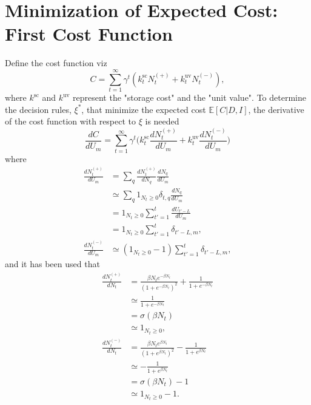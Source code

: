 \section{Minimization of Expected Cost: First Cost Function}
\label{app:deriva}
Define the cost function viz
\begin{equation}
	C = \sum_{t=1}^{\infty}\gamma^{t}(k^\text{sc}_{t}N_{t}^{(+)}+k_{t}^\text{uv}N_{t}^{(-)}),
\end{equation}
where $k^\text{sc}$ and $k^\text{uv}$ represent the "storage cost" and the "unit value". To determine the decision rules, $\xi^*$, that minimize the expected cost $\mathbb{E}[C|D,I]$, the derivative of the cost function with respect to $\xi$ is needed
\begin{equation}
		\frac{dC}{dU_m} = \sum_{t=1}^{\infty}\gamma^{t}\bigg(k^\text{sc}_{t}\frac{dN_{t}^{(+)}}{dU_m}+k_{t}^\text{uv}\frac{dN_{t}^{(-)}}{dU_m}\bigg)
	\label{eq:deriv_1ab}
\end{equation}
where
\begin{equation}
	\begin{split}
		\frac{dN_{t}^{(+)}}{dU_m}& =\sum_q 	\frac{dN_{t}^{(+)}}{dN_q}\frac{dN_q}{dU_m}\\
		& \simeq\sum_q 	1_{N_{t}\geq 0}\delta_{t,q}\frac{dN_q}{dU_m}\\
		& = 1_{N_{t}\geq 0}\sum_{t'=1}^t\frac{dU_{t'-L}}{dU_m}\\
		& = 1_{N_{t}\geq 0}\sum_{t'=1}^t\delta_{t'-L,m},\\
		\frac{dN_{t}^{(-)}}{dU_m} &\simeq (1_{N_t\geq 0}-1)\sum_{t'=1}^t\delta_{t'-L,m},
		\label{eq:deriv_2ab}
	\end{split}
\end{equation}
and it has been used that
\begin{equation}
	\begin{split}
		\frac{dN_t^{(+)}}{dN_t} & =\frac{\beta N_te^{-\beta N_t}}{(1+e^{-\beta N_t})^2}+\frac{1}{1+e^{-\beta N_t}}\\
		& \simeq \frac{1}{1+e^{-\beta N_t}}\\
		&= \sigma(\beta N_t)\\
		&\simeq 1_{N_{t}\geq 0},\\
		\frac{dN_t^{(-)}}{dN_t} & = \frac{\beta N_te^{\beta N_t}}{(1+e^{\beta N_t})^2}-\frac{1}{1+e^{\beta N_t}}\\
		& \simeq -\frac{1}{1+e^{\beta N_t}}\\
		&= \sigma(\beta N_t)-1\\
		& \simeq  1_{N_{t}\geq 0}-1.
	\end{split}
\end{equation}
